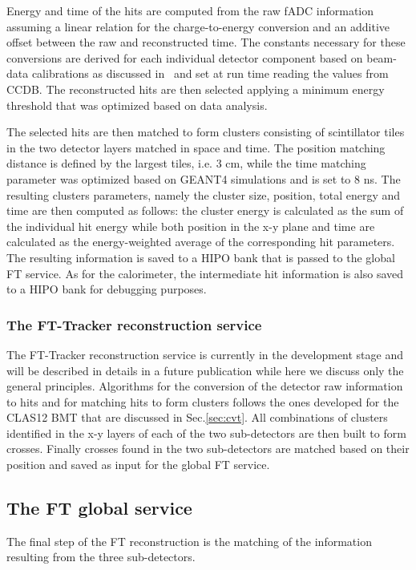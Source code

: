 Energy and time of the hits are computed from the raw fADC information assuming a linear relation for the charge-to-energy conversion and an additive offset between the raw and reconstructed time. The constants necessary for these conversions are derived for each individual detector component based on beam-data calibrations as discussed in~\cite{ft-nim} and set at run time reading the values from CCDB. The reconstructed hits are then selected applying a minimum energy threshold that was optimized based on data analysis.

The selected hits are then matched to form clusters consisting of scintillator tiles in the two detector layers matched in space and time. The position matching distance is defined by the largest tiles, i.e. 3 cm, while the time matching parameter was optimized based on GEANT4 simulations and is set to 8 ns. The resulting clusters parameters, namely the cluster size, position, total energy and time are then computed as follows: the cluster energy is calculated as the sum of the individual hit energy while both position in the x-y  plane and time are calculated as the energy-weighted average of the corresponding hit parameters. The resulting information is saved to a HIPO bank that is passed to the global FT service. As for the calorimeter, the intermediate hit information is also saved to a HIPO bank for debugging purposes.


\subsubsection{The FT-Tracker reconstruction service}
The FT-Tracker reconstruction service is currently in the development stage and will be described in details in a future publication while here we discuss only the general principles.
Algorithms for the conversion of the detector raw information to hits and for matching hits to form clusters follows the ones developed for the CLAS12 BMT that are discussed in Sec.\ref{sec:cvt}. All combinations of clusters identified in the x-y layers of each of the two sub-detectors are then built to form crosses. Finally crosses found in the two sub-detectors are matched based on their position and saved as input for the global FT service.

\subsection{The FT global service}
The final step of the FT reconstruction is the matching of the information resulting from the three sub-detectors.

